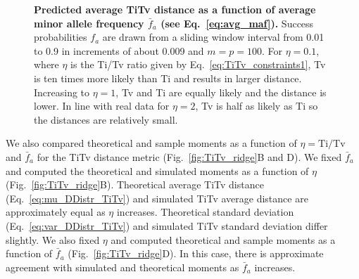 \documentclass[10pt,letterpaper]{article}
\begin{document}
\begin{figure}[H]
	\centering
	\caption{{\bf Predicted average TiTv distance as a function of average minor allele frequency $\bar{f}_a$ (see Eq.~\ref{eq:avg_maf}).} Success probabilities $f_a$ are drawn from a sliding window interval from 0.01 to 0.9 in increments of about 0.009 and $m=p=100$. For $\eta=0.1$, where $\eta$ is the Ti/Tv ratio given by Eq.~\ref{eq:TiTv_constraints1}, Tv is ten times more likely than Ti and results in larger distance. Increasing to $\eta=1$, Tv and Ti are equally likely and the distance is lower.  In line with real data for $\eta=2$, Tv is half as likely as Ti so the distances are relatively small.}\label{fig:TiTv-vs-maf}
\end{figure}


We also compared theoretical and sample moments as a function of $\eta = \text{Ti/Tv}$ and $\bar{f}_a$ for the TiTv distance metric (Fig.~\ref{fig:TiTv_ridge}B and D). We fixed $\bar{f}_a$ and computed the theoretical and simulated moments as a function of $\eta$ (Fig.~\ref{fig:TiTv_ridge}B). Theoretical average TiTv distance (Eq.~\ref{eq:mu_DDistr_TiTv}) and simulated TiTv average distance are approximately equal as $\eta$ increases. Theoretical standard deviation (Eq.~\ref{eq:var_DDistr_TiTv}) and simulated TiTv standard deviation differ slightly. We also fixed $\eta$ and computed theoretical and sample moments as a function of $\bar{f}_a$ (Fig.~\ref{fig:TiTv_ridge}D). In this case, there is approximate agreement with simulated and theoretical moments as $\bar{f}_a$ increases.
\end{document}
